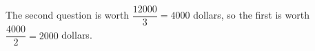 The second question is worth $\dfrac{12000}{3}=4000$ dollars, so the first is worth $\dfrac{4000}{2}=\boxed{2000}$ dollars.
